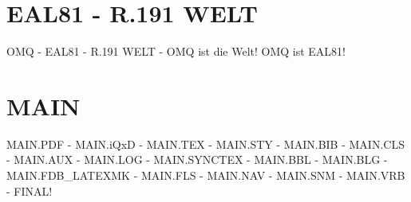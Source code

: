 \documentclass{MAIN}
\begin{document}
\maketitle
\section*{EAL81 - R.191 WELT}
OMQ - EAL81 - R.191 WELT - OMQ ist die Welt! OMQ ist EAL81!
\section*{MAIN}
MAIN.PDF - MAIN.iQxD - MAIN.TEX - MAIN.STY - MAIN.BIB - MAIN.CLS - MAIN.AUX - MAIN.LOG - MAIN.SYNCTEX - MAIN.BBL - MAIN.BLG - MAIN.FDB_LATEXMK - MAIN.FLS - MAIN.NAV - MAIN.SNM - MAIN.VRB - FINAL!
\cite{omq_eal81}

\end{document}
